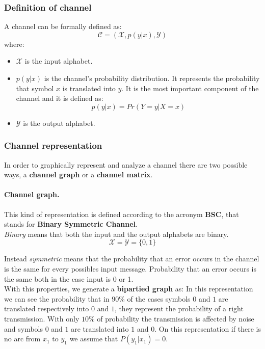 \subsubsection{Definition of channel}
A channel can be formally defined as:
$$\mathcal{C} = (\mathcal{X}, p(y|x), \mathcal{Y})$$
where:
\begin{itemize}
	\item $\mathcal{X}$ is the input alphabet.
	\item $p(y|x)$ is the channel's probability distribution. It represents the probability that symbol $x$ is translated into $y$. It is the most important component of the channel and it is defined as:
	$$p(y|x) = Pr(Y=y | X = x)$$
	\item $\mathcal{Y}$ is the output alphabet.
\end{itemize}

\subsubsection{Channel representation}
In order to graphically represent and analyze a channel there are two possible ways, a \textbf{channel graph} or a \textbf{channel matrix}.

\paragraph*{Channel graph.} This kind of representation is defined according to the acronym \textbf{BSC}, that stands for \textbf{Binary Symmetric Channel}.\\
\textit{Binary} means that both the input and the output alphabets are binary.
$$\mathcal{X} = \mathcal{Y} = \{0,1\}$$


Instead \textit{symmetric} means that the probability that an error occurs in the channel is the same for every possibles input message. Probability that an error occurs is the same both in the case input is 0 or 1.\\
With this properties, we generate a \textbf{bipartied graph} as:
In this representation we can see the probability that in $90\%$ of the cases symbols $0$ and $1$ are translated respectively into $0$ and $1$, they represent the probability of a right transmission. With only $10\%$ of probability the transmission is affected by noise and symbols $0$ and $1$ are translated into $1$ and $0$.
On this representation if there is no arc from $x_1$ to $y_1$ we assume that $P(y_1| x_1) = 0$. 
